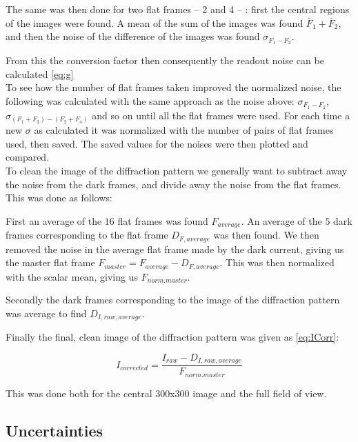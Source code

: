 \documentclass{emulateapj}
\begin{document}
The same was then done for two flat frames -- 2 and 4 -- : first the central regions of the images were found. A mean of the sum of the images was found $\bar{F}_1 + \bar{F}_2$, and then the noise of the difference of the images was found $\sigma_{F_1 - F_2}$.

From this the conversion factor then consequently the readout noise can be calculated \eqref{eq:g}\\

To see how the number of flat frames taken improved the normalized noise, the following was calculated with the same approach as the noise above:
$\sigma_{F_1-F_2}$, $\sigma_{(F_1 + F_3) - (F_2+F_4)}$ and so on until all the flat frames were used. For each time a new $\sigma$ as calculated it was normalized with the number of pairs of flat frames used, then saved. The saved values for the noises were then plotted and compared.\\

To clean the image of the diffraction pattern we generally want to subtract away the noise from the dark frames, and divide away the noise from the flat frames. This was done as follows:

First an average of the $16$ flat frames was found $F_{average}$. An average of the $5$ dark frames corresponding to the flat frame $D_{F,average}$ was then found. We then removed the noise in the average flat frame made by the dark current, giving us the master flat frame $F_{master} = F_{average}-D_{F,average}$. This was then normalized with the scalar mean, giving us $F_{norm. master}$.

Secondly the dark frames corresponding to the image of the diffraction pattern was average to find $D_{I,raw,average}$. 

Finally the final, clean image of the diffraction pattern was given as \eqref{eq:ICorr}:

\begin{equation}
I_{corrected} = \frac{I_{raw} - D_{I,raw,average}}{F_{norm. master}}
\end{equation}

This was done both for the central 300x300 image and the full field of view.



\subsection{Uncertainties}
\end{document}
